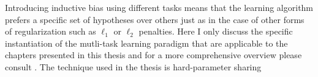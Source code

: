Introducing inductive bias using different tasks means that the learning algorithm prefers a specific set of hypotheses over others just as in the case of other forms of regularization such as $\ell_1$ or $\ell_2$ penalties. Here I only discuss the specific instantiation of the mutli-task learning paradigm that are applicable to the chapters presented in this thesis and for a more comprehensive overview please consult \cite{ruder2017overview}. The technique used in the thesis
is hard-parameter sharing \cite{caruana1997multitask}
